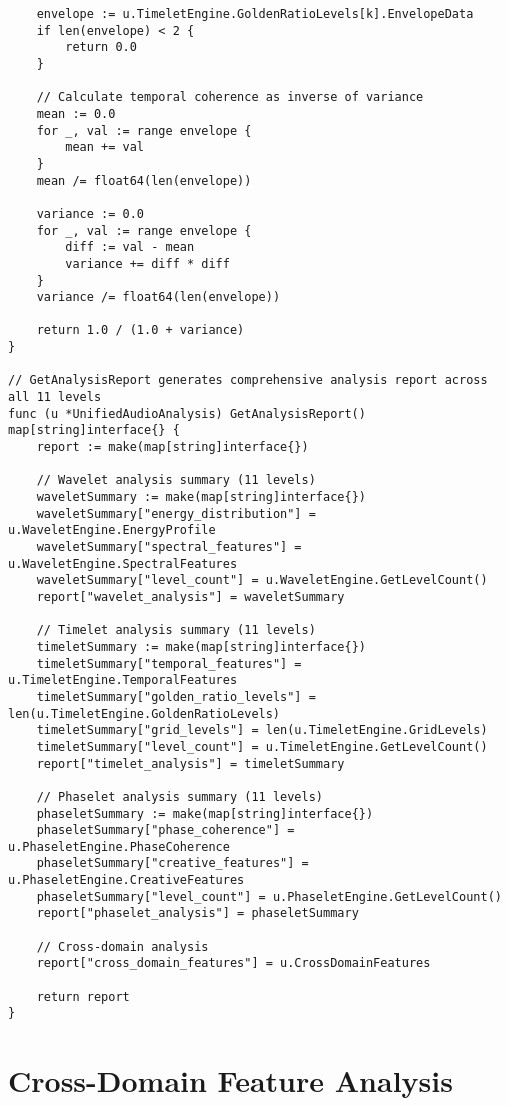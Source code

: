 \begin{tcolorbox}[colback=CodeBackground, colframe=DarkGray, title=Unified 11-Level Audio Analysis Framework, fonttitle=\bfseries]
\begin{verbatim}
    envelope := u.TimeletEngine.GoldenRatioLevels[k].EnvelopeData
    if len(envelope) < 2 {
        return 0.0
    }
    
    // Calculate temporal coherence as inverse of variance
    mean := 0.0
    for _, val := range envelope {
        mean += val
    }
    mean /= float64(len(envelope))
    
    variance := 0.0
    for _, val := range envelope {
        diff := val - mean
        variance += diff * diff
    }
    variance /= float64(len(envelope))
    
    return 1.0 / (1.0 + variance)
}

// GetAnalysisReport generates comprehensive analysis report across all 11 levels
func (u *UnifiedAudioAnalysis) GetAnalysisReport() map[string]interface{} {
    report := make(map[string]interface{})
    
    // Wavelet analysis summary (11 levels)
    waveletSummary := make(map[string]interface{})
    waveletSummary["energy_distribution"] = u.WaveletEngine.EnergyProfile
    waveletSummary["spectral_features"] = u.WaveletEngine.SpectralFeatures
    waveletSummary["level_count"] = u.WaveletEngine.GetLevelCount()
    report["wavelet_analysis"] = waveletSummary
    
    // Timelet analysis summary (11 levels)
    timeletSummary := make(map[string]interface{})
    timeletSummary["temporal_features"] = u.TimeletEngine.TemporalFeatures
    timeletSummary["golden_ratio_levels"] = len(u.TimeletEngine.GoldenRatioLevels)
    timeletSummary["grid_levels"] = len(u.TimeletEngine.GridLevels)
    timeletSummary["level_count"] = u.TimeletEngine.GetLevelCount()
    report["timelet_analysis"] = timeletSummary
    
    // Phaselet analysis summary (11 levels)
    phaseletSummary := make(map[string]interface{})
    phaseletSummary["phase_coherence"] = u.PhaseletEngine.PhaseCoherence
    phaseletSummary["creative_features"] = u.PhaseletEngine.CreativeFeatures
    phaseletSummary["level_count"] = u.PhaseletEngine.GetLevelCount()
    report["phaselet_analysis"] = phaseletSummary
    
    // Cross-domain analysis
    report["cross_domain_features"] = u.CrossDomainFeatures
    
    return report
}
\end{verbatim}
\end{tcolorbox}

\section{Cross-Domain Feature Analysis}

